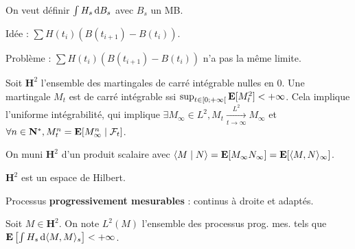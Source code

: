 On veut définir $\int H_s \mathop{}\mathopen{}\mathrm{d} B_s$ avec $B_s$ un MB.

Idée : $\sum H(t_i) (B(t_{i + 1}) - B(t_i))$.

Problème : $\sum H(t_i) (B(t_{i + 1}) - B(t_i))$ n'a pas la même limite.

Soit $\mathbf{H}^2$ l'ensemble des martingales de carré intégrable nulles en 0.
Une martingale $M_t$ est de carré intégrable ssi $\sup_{t \in \mathopen{}\mathclose{\left[0\mathclose{}\mathpunct{};+\infty\right[}} \mathbf{E}[M_t^2] < +\infty$.
Cela implique l'uniforme intégrabilité, qui implique $\exists M_\infty \in L^2, M_t \underset{t \to \infty}{\overset{L^2}{\longrightarrow}} M_\infty$ et $\forall n \in \mathbf{N}^*, M_t^n = \mathbf{E}[M_\infty^n \mid \mathcal{F}_t]$.

On muni $\mathbf{H}^2$ d'un produit scalaire avec $\left\langle M \mid N \right\rangle = \mathbf{E}[M_\infty N_\infty] = \mathbf{E}[\langle M,N \rangle_\infty]$.

\begin{thm}
	$\mathbf{H}^2$ est un espace de Hilbert.
\end{thm}





\begin{defn}
	Processus \textbf{progressivement mesurables} : continus à droite et adaptés.
\end{defn}

\begin{note}
	Soit $M \in \mathbf{H}^2$.
	On note $L^2(M)$ l'ensemble des processus prog. mes. tels que $\mathbf{E} \left[ \int H_s \mathop{}\mathopen{}\mathrm{d} \langle M,M \rangle_s \right] < +\infty$.
\end{note}

